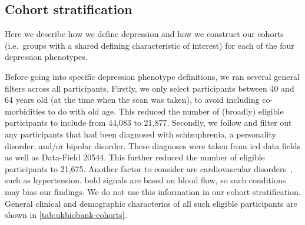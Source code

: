 \subsection{Cohort stratification}
\label{subsec:cohort-stratification}

Here we describe how we define depression and how we construct our cohorts (i.e.~groups with a shared defining characteristic of interest) for each of the four depression phenotypes.

Before going into specific depression phenotype definitions, we ran several general filters across all participants.
Firstly, we only select participants between 40 and 64 years old (at the time when the scan was taken), to avoid including co-morbidities to do with old age.
This reduced the number of (broadly) eligible participants to include from 44,083 to 21,877.
Secondly, we follow \textcite{Howard2020} and filter out any participants that had been diagnosed with schizophrenia, a personality disorder, and/or bipolar disorder.
These diagnoses were taken from \gls{icd} data fields as well as Data-Field 20544.
This further reduced the number of eligible participants to 21,675.
Another factor to consider are cardiovascular disorders~\parencite{Whooley2013}, such as hypertension.
\Gls{bold} signals are based on blood flow, so such conditions may bias our findings.
We do not use this information in our cohort stratification.
General clinical and demographic characterics of all such eligible participants are shown in \cref{tab:ukbiobank-cohorts}.

